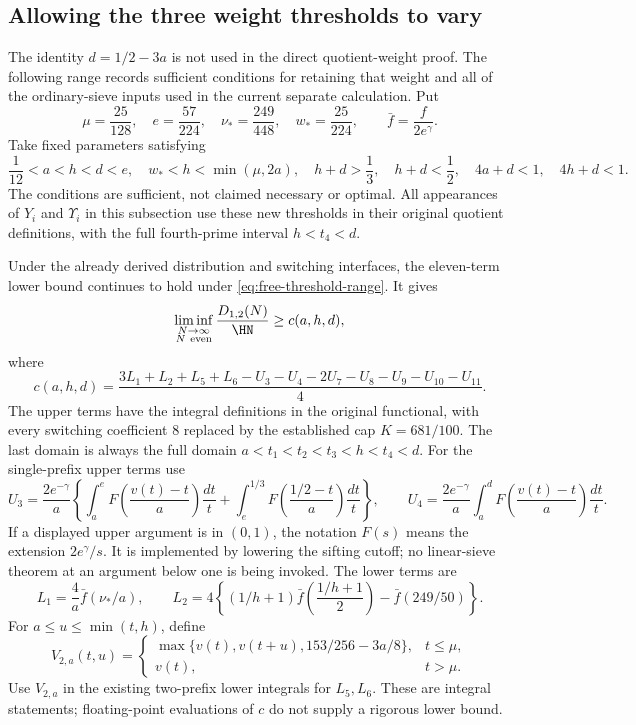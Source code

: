 \subsection{Allowing the three weight thresholds to vary}
\label{sec:free-weight-thresholds}

The identity $d=1/2-3a$ is not used in the direct quotient-weight
proof. The following range records sufficient conditions for retaining
that weight and all of the ordinary-sieve inputs used in the current
separate calculation. Put
\[
 \mu=\frac{25}{128},\quad e=\frac{57}{224},\quad
 \nu_*=\frac{249}{448},\quad w_*=\frac{25}{224},
 \qquad \bar f=\frac{f}{2e^\gamma}.
\]
Take fixed parameters satisfying
\begin{equation}\label{eq:free-threshold-range}
 \frac1{12}<a<h<d<e,\quad w_*<h<\min(\mu,2a),\quad
 h+d>\frac13,\quad h+d<\frac12,\quad
 4a+d<1,\quad 4h+d<1.
\end{equation}
The conditions are sufficient, not claimed necessary or optimal.
All appearances of $Y_i$ and $\Upsilon_i$ in this subsection use these
new thresholds in their original quotient definitions, with the full
fourth-prime interval $h<t_4<d$.

\begin{proposition}
\label{prop:free-weight-thresholds}
Under the already derived distribution and switching interfaces,
the eleven-term lower bound continues to hold under
\eqref{eq:free-threshold-range}. It gives
\[
 \liminf_{\substack{N\to\infty\\N\ {\rm even}}}
 \frac{D_{1,2}(N)}{\HN}\ge c(a,h,d),
\]
where
\[
 c(a,h,d)=\frac{3L_1+L_2+L_5+L_6-U_3-U_4
                 -2U_7-U_8-U_9-U_{10}-U_{11}}4.
\]
The upper terms have the integral definitions in the original functional,
with every switching coefficient $8$ replaced by the established cap
$K=681/100$. The last domain is always the full domain
$a<t_1<t_2<t_3<h<t_4<d$.
For the single-prefix upper terms use
\[
 U_3=\frac{2e^{-\gamma}}a
 \left\{\int_a^e F\left(\frac{v(t)-t}{a}\right)\frac{dt}{t}
       +\int_e^{1/3}F\left(\frac{1/2-t}{a}\right)\frac{dt}{t}\right\},
 \qquad
 U_4=\frac{2e^{-\gamma}}a
       \int_a^dF\left(\frac{v(t)-t}{a}\right)\frac{dt}{t}.
\]
If a displayed upper argument is in $(0,1)$, the notation $F(s)$
means the extension $2e^\gamma/s$. It is implemented by lowering the
sifting cutoff; no linear-sieve theorem at an argument below one is
being invoked.
The lower terms are
\[
 L_1=\frac4a\bar f(\nu_*/a),\qquad
 L_2=4\left\{(1/h+1)\bar f\left(\frac{1/h+1}{2}\right)
                         -\bar f(249/50)\right\}.
\]
For $a\le u\le\min(t,h)$, define
\[
 V_{2,a}(t,u)=
 \begin{cases}
 \max\{v(t),v(t+u),153/256-3a/8\},&t\le\mu,\\
 v(t),&t>\mu.
 \end{cases}
\]
Use $V_{2,a}$ in the existing two-prefix lower integrals for $L_5,L_6$.
These are integral statements; floating-point evaluations of $c$ do not
supply a rigorous lower bound.
\end{proposition}

